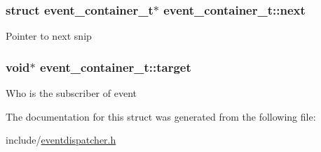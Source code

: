 \subsubsection[{\texorpdfstring{next}{next}}]{\setlength{\rightskip}{0pt plus 5cm}struct {\bf event\+\_\+container\+\_\+t}$\ast$ event\+\_\+container\+\_\+t\+::next}\hypertarget{structevent__container__t_aa376d3f2363bf71a71c7b740cbc26dcd}{}\label{structevent__container__t_aa376d3f2363bf71a71c7b740cbc26dcd}
Pointer to next snip 
\subsubsection[{\texorpdfstring{target}{target}}]{\setlength{\rightskip}{0pt plus 5cm}void$\ast$ event\+\_\+container\+\_\+t\+::target}\hypertarget{structevent__container__t_a30d9aecb000fe0e8b061b970ad1def64}{}\label{structevent__container__t_a30d9aecb000fe0e8b061b970ad1def64}
Who is the subscriber of event 

The documentation for this struct was generated from the following file\+:\begin{DoxyCompactItemize}
\item 
include/\hyperlink{eventdispatcher_8h}{eventdispatcher.\+h}\end{DoxyCompactItemize}
